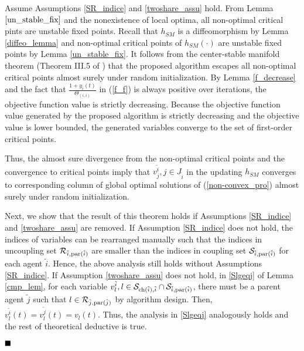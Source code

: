\documentclass[journal]{IEEEtran}
\newtheorem{remark}{Remark}[section]
\begin{document}
Assume Assumptions \ref{SR_indice} and \ref{twoshare_assu} hold. From Lemma $\ref{un_stable_fix}$ and the nonexistence of local optima, all non-optimal critical pints are unstable fixed points. Recall that  $h_{SM}$ is a diffeomorphism by Lemma \ref{diffeo_lemma} and non-optimal critical points of $h_{SM}(\cdot)$ are unstable fixed points by Lemma \ref{un_stable_fix}. It follows from the center-stable manifold theorem (Theorem III.5 of \cite{shub_book}) that the proposed algorithm escapes all non-optimal critical points almost surely under random initialization. By Lemma \ref{f_decrease} and the fact that  $\frac{1+y_i(t)}{\Theta_{(i,i)}}$ in (\ref{f_f}) is always positive over iterations, the objective function value is strictly decreasing. Because the objective function value generated by the proposed algorithm is strictly decreasing and the objective value is lower bounded, the generated variables converge to the set of  first-order critical points. {Thus, the almost sure divergence from the non-optimal critical points and the convergence to critical points imply that $v_j^{\tilde{i}}, j\in J_{\tilde{i}}$ in the updating $h_{SM}$ converges to corresponding column of global optimal solutions of (\ref{non-convex_pro}) almost surely under random initialization.
\par Next, we show that the result of this theorem holds if Assumptions \ref{SR_indice} and \ref{twoshare_assu} are removed. If Assumption \ref{SR_indice} does not hold, the indices of variables can be rearranged manually such that the indices in uncoupling set $\mathcal{R}_{\tilde{i},{\rm par}(\tilde{i})}$ are smaller than the indices in coupling set $\mathcal{S}_{\tilde{i},{\rm par}(\tilde{i})}$ for each agent $\tilde{i}$. Hence, the above analysis still holds without Assumptions \ref{SR_indice}. If Assumption \ref{twoshare_assu} does not hold, in \eqref{Slgeqj} of Lemma \ref{cmp_lem}, for each variable $v_l^{\tilde{i}}, l\in \mathcal{S}_{{\rm ch}(\tilde{i}), \tilde{i}}\cap \mathcal{S}_{\tilde{i},{\rm par}(\tilde{i})}$, there must be a parent agent $\tilde{j}$ such that $l\in \mathcal{R}_{\tilde{j},{\rm par}(\tilde{j})}$ by algorithm design. Then, $v_l^{\tilde{i}}(t)=v_l^{\tilde{j}}(t)=v_l(t)$. Thus, the analysis in \eqref{Slgeqj} analogously holds and the rest of theoretical deductive is true.}
$\hfill\blacksquare$
\end{document}
